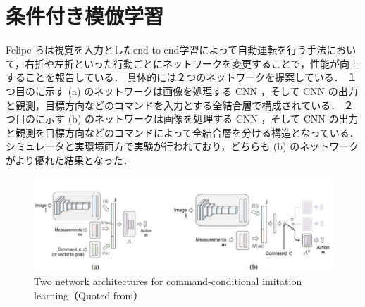 \section{条件付き模倣学習}
Felipe ら\cite{codevilla2018endtoend}は視覚を入力としたend-to-end学習によって自動運転を行う手法において，右折や左折といった行動ごとにネットワークを変更することで，性能が向上することを報告している．
具体的には２つのネットワークを提案している．
１つ目のに示す (a) のネットワークは画像を処理する CNN ，そして CNN の出力と観測，目標方向などのコマンドを入力とする全結合層で構成されている．
２つ目のに示す (b) のネットワークは画像を処理する CNN ，そして CNN の出力と観測を目標方向などのコマンドによって全結合層を分ける構造となっている．
シミュレータと実環境両方で実験が行われており，どちらも (b) のネットワークがより優れた結果となった．

\begin{figure}[htbp]
  \centering
  \includegraphics[width=140mm]{images/pdf/other/branched.pdf}
  \caption{Two network architectures for command-conditional imitation learning（Quoted from\cite{codevilla2018endtoend}）}
  \label{fig:felipe_branched}
\end{figure}

\clearpage